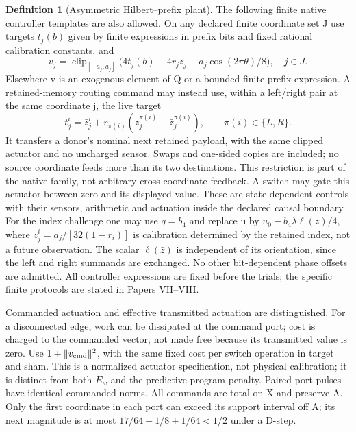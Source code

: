 \documentclass[11pt,a4paper]{article}
\theoremstyle{definition}
\newtheorem{definition}[theorem]{Definition}
\begin{document}
\begin{definition}[Asymmetric Hilbert--prefix plant]
The following finite native controller templates are also allowed. On any
declared finite coordinate set J use targets $t_j(b)$ given by finite
expressions in prefix bits and fixed rational calibration constants, and
\[
 v_j=\operatorname{clip}_{[-a_j,a_j]}
       \bigl(4t_j(b)-4r_jz_j-a_j\cos(2\pi\theta)/8\bigr),\quad j\in J.
\]
Elsewhere v is an exogenous element of Q or a bounded finite prefix expression.
A retained-memory routing command may instead use, within a left/right pair
at the same coordinate j, the live target
\[
 t_j^i=\bar z_j^i+r_{\pi(i)}(z_j^{\pi(i)}-\bar z_j^{\pi(i)}),
 \qquad \pi(i)\in\{L,R\}.
\]
It transfers a donor's nominal next retained payload, with the same clipped
actuator and no uncharged sensor. Swaps and one-sided copies are included;
no source coordinate feeds more than its two destinations. This restriction
is part of the native family, not arbitrary cross-coordinate feedback.
A switch may gate this actuator between zero and its displayed value. These
are state-dependent controls with their sensors, arithmetic and actuation
inside the declared causal boundary. For the index challenge one may use
$q=b_4$ and replace u by $u_0-b_4\lambda\ell(\bar z)/4$, where
$\bar z_j^i=a_j/[32(1-r_i)]$ is calibration determined by the retained index,
not a future observation. The scalar $\ell(\bar z)$ is independent of its
orientation, since the left and right summands are exchanged.
No other bit-dependent phase offsets are admitted. All controller expressions
are fixed before the trials; the specific finite protocols are stated in
Papers VII--VIII.

Commanded actuation and effective transmitted actuation are distinguished.
For a disconnected edge, work can be dissipated at the command port; cost
is charged to the commanded vector, not made free because its transmitted
value is zero. Use $1+\|v_{\rm cmd}\|^2$, with the same fixed cost per switch
operation in target and sham. This is a normalized actuator specification,
not physical calibration; it is distinct from both $E_w$ and the predictive
program penalty. Paired port pulses have identical commanded norms.
All commands are total on X and preserve A. Only the first coordinate in each port
can exceed its support interval off A; its next magnitude is at most
$17/64+1/8+1/64<1/2$ under a D-step.
\end{definition}
\end{document}
